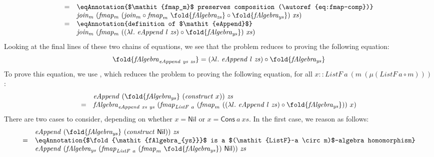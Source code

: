 \begin{proof*}
\begin{displaymath}
\begin{array}{cl}
      =&\eqAnnotation{$\mathit{fmap_m}$ preserves composition (\autoref{eq:fmap-comp})} \\
      &\mathit{join_m}~(\mathit{fmap_m}~(\mathit{join_m} \circ \mathit{fmap}_m~\fold{\mathit{fAlgebra_{zs}}} \circ \fold{\mathit{fAlgebra_{ys}}})~\mathit{xs}) \\
      =&\eqAnnotation{definition of $\mathit{eAppend}$} \\
      &\mathit{join_m}~(\mathit{fmap_m}~((\lambda l.~\mathit{eAppend}~l~\mathit{zs}) \circ \fold{\mathit{fAlgebra_{ys}}})~\mathit{xs})
    \end{array}
  \end{displaymath}
  Looking at the final lines of these two chains of equations, we see
  that the problem reduces to proving the following equation:
  \begin{displaymath}
    \fold{\mathit{fAlgebra}_{\mathit{eAppend}~\mathit{ys}~\mathit{zs}}} = (\lambda l.~\mathit{eAppend}~l~\mathit{zs}) \circ \fold{\mathit{fAlgebra_{ys}}}
  \end{displaymath}
  To prove this equation, we use , which
  reduces the problem to proving the following equation, for all $x ::
  \mathit{ListF}~a~(m~(\mu(\mathit{ListF}~a \circ m)))$:
  \begin{displaymath}
    \begin{array}{cl}
      &\mathit{eAppend}~(\fold{\mathit{fAlgebra_{ys}}}~(\mathit{construct}~x))~\mathit{zs} \\
      =& \mathit{fAlgebra}_{\mathit{eAppend}~\mathit{xs}~\mathit{ys}}~(\mathit{fmap}_{\mathit{ListF}~a}~(\mathit{fmap}_m~((\lambda l.~\mathit{eAppend}~l~\mathit{zs}) \circ \fold{\mathit{fAlgebra_{ys}}}))~x)
    \end{array}
  \end{displaymath}
  There are two cases to consider, depending on whether $x =
  \mathsf{Nil}$ or $x = \mathsf{Cons}~a~\mathit{xs}$. In the first
  case, we reason as follows:
  \begin{displaymath}
    \begin{array}{cl}
      &\mathit{eAppend}~(\fold{\mathit{fAlgebra_{ys}}}~(\mathit{construct}~\mathsf{Nil}))~\mathit{zs} \\
      =&\eqAnnotation{$\fold{\mathit{fAlgebra_{ys}}}$ is a $(\mathit{ListF}~a \circ m)$-algebra homomorphism} \\
      &\mathit{eAppend}~(\mathit{fAlgebra_{ys}}~(\mathit{fmap}_{\mathit{ListF}~a}~(\mathit{fmap}_m~\fold{\mathit{fAlgebra_{ys}}})~\mathsf{Nil}))~\mathit{zs} \\

\end{array}
\end{displaymath}
\end{proof*}
